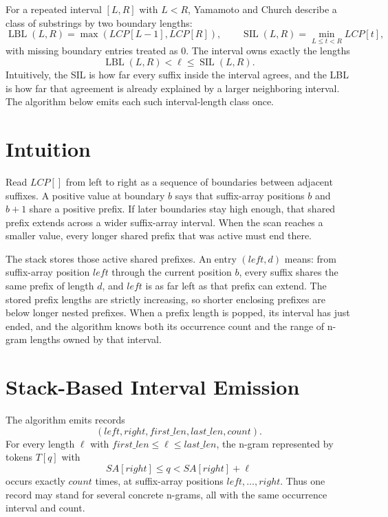 \documentclass[11pt]{article}
\begin{document}
For a repeated interval \([L,R]\) with \(L<R\), Yamamoto and Church describe a
class of substrings by two boundary lengths:
\[
\operatorname{LBL}(L,R)=\max(\mathit{LCP}[L-1],\mathit{LCP}[R]),
\qquad
\operatorname{SIL}(L,R)=\min_{L\leq t<R}\mathit{LCP}[t],
\]
with missing boundary entries treated as \(0\).  The interval owns exactly the
lengths
\[
\operatorname{LBL}(L,R)<\ell\leq\operatorname{SIL}(L,R).
\]
Intuitively, the SIL is how far every suffix inside the interval agrees, and
the LBL is how far that agreement is already explained by a larger neighboring
interval.  The algorithm below emits each such interval-length class once.

\section{Intuition}

Read \(\mathit{LCP}[]\) from left to right as a sequence of boundaries between
adjacent suffixes.  A positive value at boundary \(b\) says that suffix-array
positions \(b\) and \(b+1\) share a positive prefix.  If later boundaries stay
high enough, that shared prefix extends across a wider suffix-array interval.
When the scan reaches a smaller value, every longer shared prefix that was
active must end there.

The stack stores those active shared prefixes.  An entry
\((\mathit{left},d)\) means: from suffix-array position \(\mathit{left}\)
through the current position \(b\), every suffix shares the same prefix of
length \(d\), and \(\mathit{left}\) is as far left as that prefix can extend.
The stored prefix lengths are strictly increasing, so shorter enclosing prefixes
are below longer nested prefixes.  When a prefix length is popped, its interval
has just ended, and the algorithm knows both its occurrence count and the range
of n-gram lengths owned by that interval.

\section{Stack-Based Interval Emission}

The algorithm emits records
\[
(\mathit{left},\mathit{right},\mathit{first\_len},\mathit{last\_len},\mathit{count}).
\]
For every length \(\ell\) with
\(\mathit{first\_len}\leq\ell\leq\mathit{last\_len}\), the n-gram represented by
tokens \(T[q]\) with
\[
\mathit{SA}[\mathit{right}]\leq q<\mathit{SA}[\mathit{right}]+\ell
\]
occurs exactly \(\mathit{count}\) times, at suffix-array positions
\(\mathit{left},\ldots,\mathit{right}\).  Thus one record may stand for several
concrete n-grams, all with the same occurrence interval and count.
\end{document}
